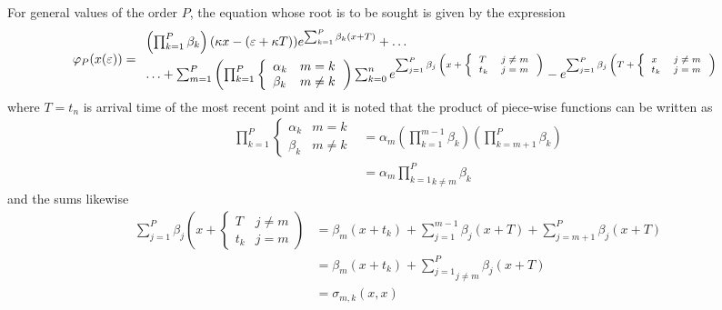 \documentclass{amsart}
\newcommand{\tmscript}[1]{\text{\scriptsize{$#1$}}}
\begin{document}
For general values of the order $P$, the equation whose root is to be sought
is given by the expression
\begin{equation}
  \varphi_P ( x ( \varepsilon)) = \begin{array}{l}
    \left( \prod_{k = 1}^P \beta_k \right) ( \kappa x - ( \varepsilon + \kappa
    T)) e^{\sum_{k = 1}^P \beta_k ( x + T)} + \ldots\\
    \ldots + \sum_{m = 1}^P \left( \prod_{k = 1}^{ P} \left\{
    \begin{array}{ll}
      \alpha_k & m = k\\
      \beta_k & m \neq k
    \end{array} \right. \right) \sum_{k = 0}^n e^{\tmscript{\sum_{j = 1}^P
    \beta_j \left( x + \left\{ \begin{array}{ll}
      T & j \neq m\\
      t_k & j = m
    \end{array} \right. \right)}} - e^{\tmscript{\sum_{j = 1}^P \beta_j \left(
    T + \left\{ \begin{array}{ll}
      x & j \neq m\\
      t_k & j = m
    \end{array} \right. \right)}}
  \end{array} \label{prediction}
\end{equation}
where $T = t_n$ is arrival time of the most recent point and it is noted that
the product of piece-wise functions can be written as
\begin{equation}
  \begin{array}{ll}
    \prod_{k = 1}^{ P} \left\{ \begin{array}{ll}
      \alpha_k & m = k\\
      \beta_k & m \neq k
    \end{array} \right. & = \alpha_m \left( \prod_{k = 1}^{m - 1} \beta_k
    \right) \left( \prod_{k = m + 1}^P \beta_k \right)\\
    & = \alpha_m \underset{k \neq m}{\prod_{k = 1}^P} \beta_k
  \end{array}
\end{equation}
and the sums likewise
\begin{equation}
  \begin{array}{ll}
    \sum_{j = 1}^P \beta_j \left( x + \left\{ \begin{array}{ll}
      T & j \neq m\\
      t_k & j = m
    \end{array} \right. \right) & = \beta_m ( x + t_k)_{} + \sum_{j = 1}^{m -
    1} \beta_j ( x + T) + \sum_{j = m + 1}^P \beta_j ( x + T)\\
    & = \beta_m ( x + t_k)_{} + \underset{j \neq m}{\sum_{j = 1}^P} \beta_j (
    x + T)\\
    & = \sigma_{m, k} ( x, x)
  \end{array}
\end{equation}
\end{document}

